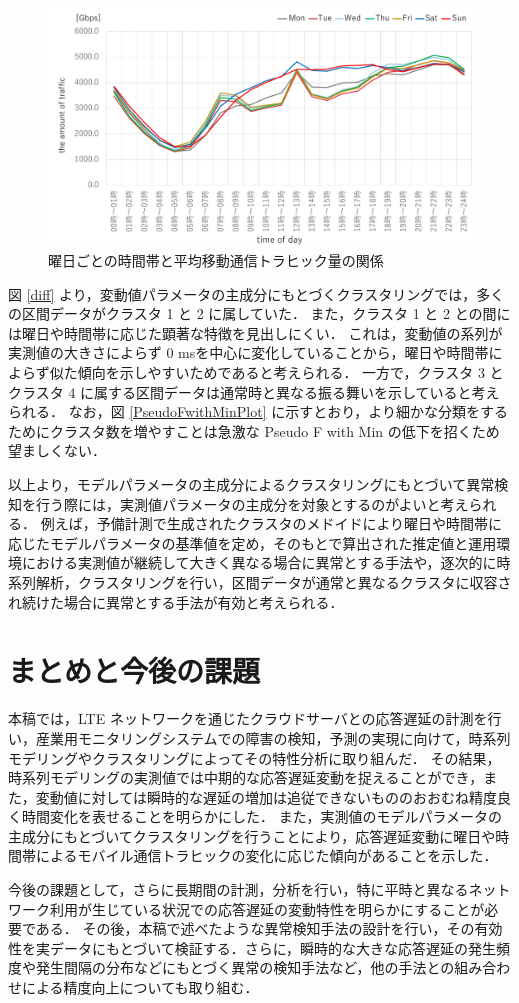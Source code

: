 \documentclass[technicalreport]{ieicej}
\begin{document}
\begin{figure}[tb]
\centering
\includegraphics[height=0.55\hsize,width = \hsize]{traffic.pdf}
\caption{曜日ごとの時間帯と平均移動通信トラヒック量の関係}
\label{traffic}
\end{figure}

図 \ref{diff} より，変動値パラメータの主成分にもとづくクラスタリングでは，多くの区間データがクラスタ 1 と 2 に属していた．
また，クラスタ 1 と 2 との間には曜日や時間帯に応じた顕著な特徴を見出しにくい．
これは，変動値の系列が実測値の大きさによらず 0 msを中心に変化していることから，曜日や時間帯によらず似た傾向を示しやすいためであると考えられる．
一方で，クラスタ 3 とクラスタ 4 に属する区間データは通常時と異なる振る舞いを示していると考えられる．
なお，図 \ref{PseudoFwithMinPlot} に示すとおり，より細かな分類をするためにクラスタ数を増やすことは急激な Pseudo F with Min の低下を招くため望ましくない．

以上より，モデルパラメータの主成分によるクラスタリングにもとづいて異常検知を行う際には，実測値パラメータの主成分を対象とするのがよいと考えられる．
例えば，予備計測で生成されたクラスタのメドイドにより曜日や時間帯に応じたモデルパラメータの基準値を定め，そのもとで算出された推定値と運用環境における実測値が継続して大きく異なる場合に異常とする手法や，逐次的に時系列解析，クラスタリングを行い，区間データが通常と異なるクラスタに収容され続けた場合に異常とする手法が有効と考えられる．
\section{まとめと今後の課題}
本稿では，LTE ネットワークを通じたクラウドサーバとの応答遅延の計測を行い，産業用モニタリングシステムでの障害の検知，予測の実現に向けて，時系列モデリングやクラスタリングによってその特性分析に取り組んだ．
その結果，時系列モデリングの実測値では中期的な応答遅延変動を捉えることができ，また，変動値に対しては瞬時的な遅延の増加は追従できないもののおおむね精度良く時間変化を表せることを明らかにした．
また，実測値のモデルパラメータの主成分にもとづいてクラスタリングを行うことにより，応答遅延変動に曜日や時間帯によるモバイル通信トラヒックの変化に応じた傾向があることを示した．

今後の課題として，さらに長期間の計測，分析を行い，特に平時と異なるネットワーク利用が生じている状況での応答遅延の変動特性を明らかにすることが必要である．
その後，本稿で述べたような異常検知手法の設計を行い，その有効性を実データにもとづいて検証する．さらに，瞬時的な大きな応答遅延の発生頻度や発生間隔の分布などにもとづく異常の検知手法など，他の手法との組み合わせによる精度向上についても取り組む．



\end{document}
